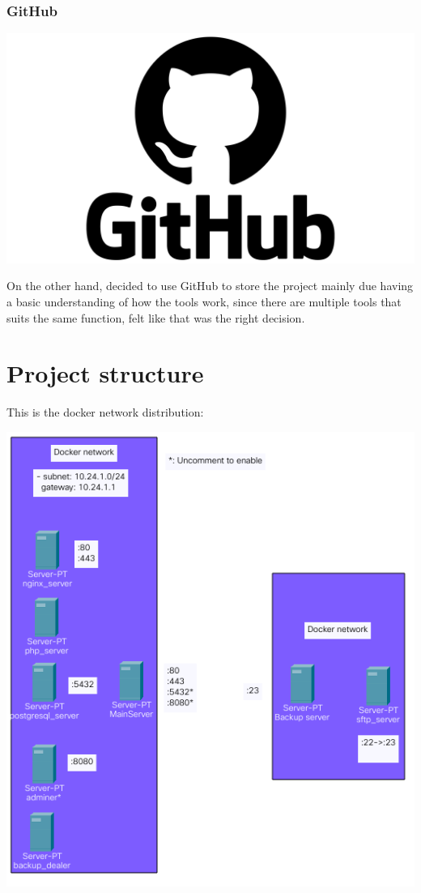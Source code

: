 \documentclass[11pt]{article}
\begin{document}
        \newpage
        \subsubsection[GitHub]{GitHub}

        \begin{center}
            \includegraphics[scale=0.045]{logo_github}
        \end{center}

        \begin{flushleft}
            On the other hand, decided to use GitHub to store the project mainly due having a basic understanding of how
            the tools work, since there are multiple tools that suits the same function, felt like that was the right decision.
        \end{flushleft}


    \newpage
    \section{Project structure}\label{sec:projectstructure}

    This is the docker network distribution:
    \begin{center}
    \includegraphics[scale=1]{NetworkDistribution}
    \end{center}
\end{document}
